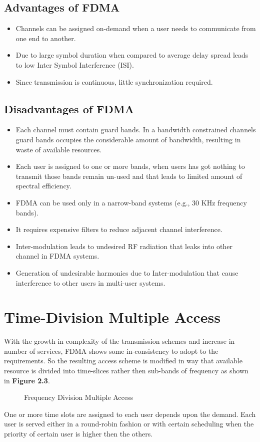 \subsection{Advantages of FDMA}
\begin{itemize}
\item Channels can be assigned on-demand when a user needs to communicate from one end to another.
\item Due to large symbol duration when compared to average delay spread leads to low Inter Symbol Interference (ISI).
\item Since transmission is continuous, little synchronization required.
\end{itemize}
\subsection{Disadvantages of FDMA}
\begin{itemize}
\item Each channel must contain guard bands. In a bandwidth constrained channels guard bands occupies the considerable amount of bandwidth, resulting in waste of available resources.
\item Each user is assigned to one or more bands, when users has got nothing to transmit those bands remain un-used and that leads to limited amount of spectral efficiency.
\item FDMA can be used only in a narrow-band systems (e.g., 30 KHz frequency bands).
\item It requires expensive filters to reduce adjacent channel interference.
\item Inter-modulation leads to undesired RF radiation that leaks into other channel in FDMA systems.
\item Generation of undesirable harmonics due to Inter-modulation that cause interference to other users in multi-user systems. 
\end{itemize}
\section{Time-Division Multiple Access}
With the growth in complexity of the transmission schemes and increase in number of services, FDMA shows some in-consistency to adopt to the requirements. So the resulting access scheme is modified in way that available resource is divided into time-slices rather then sub-bands of frequency as shown in \textbf{Figure 2.3}.
\begin{figure}[htb]
  \centerline{  }
  \caption{Frequency Division Multiple Access}
\end{figure}
One or more time slots are assigned to each user depends upon the demand. Each user is served either in a round-robin fashion or with certain scheduling when the priority of certain user is higher then the others. 
